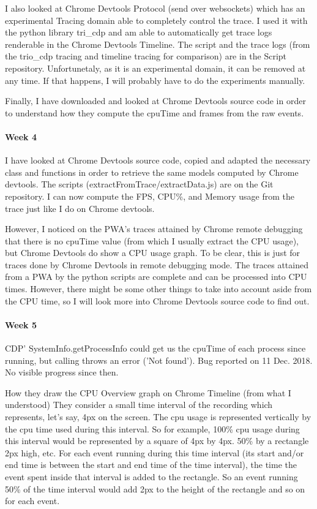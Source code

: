\documentclass{kththesis}
\begin{document}
I also looked at Chrome Devtools Protocol (send over websockets) which has an experimental Tracing domain able to completely control the trace. I used it with the python library tri\_cdp and am able to automatically get trace logs renderable in the Chrome Devtools Timeline. The script and the trace logs (from the trio\_cdp tracing and timeline tracing for comparison) are in the Script repository. 
Unfortunetaly, as it is an experimental domain, it can be removed at any time. If that happens, I will probably have to do the experiments manually.

Finally, I have downloaded and looked at Chrome Devtools source code in order to understand how they compute the cpuTime and frames from the raw events.
\paragraph{Week 4}
I have looked at Chrome Devtools source code, copied and adapted the necessary class and functions in order to retrieve the same models computed by Chrome devtools. The scripts (extractFromTrace/extractData.js) are on the Git repository. I can now compute the FPS, CPU\%, and Memory usage from the trace just like I do on Chrome devtools.

However, I noticed on the PWA's traces attained by Chrome remote debugging that there is no cpuTime value (from which I usually extract the CPU usage), but Chrome Devtools do show a CPU usage graph. To be clear, this is just for traces done by Chrome Devtools in remote debugging mode. The traces attained from a PWA by the python scripts are complete and can be processed into CPU times. However, there might be some other things to take into account aside from the CPU time, so I will look more into Chrome Devtools source code to find out.

\paragraph{Week 5}
CDP' SystemInfo.getProcessInfo could get us the cpuTime of each process since running, but calling throws an error ('Not found'). Bug reported on 11 Dec. 2018. No visible progress since then. 

How they draw the CPU Overview graph on Chrome Timeline (from what I understood)
   They consider a small time interval of the recording which represents, let's say, 4px on the screen. The cpu usage is represented vertically by the cpu time used during this interval. So for example, 100\% cpu usage during this interval would be represented by a square of 4px by 4px. 50\% by a rectangle 2px high, etc.  For each event running during this time interval (its start and/or end time is between the start and end time of the time interval), the time the event spent inside that interval is added to the rectangle. So an event running 50\% of the time interval would add 2px to the height of the rectangle and so on for each event. 
\end{document}

